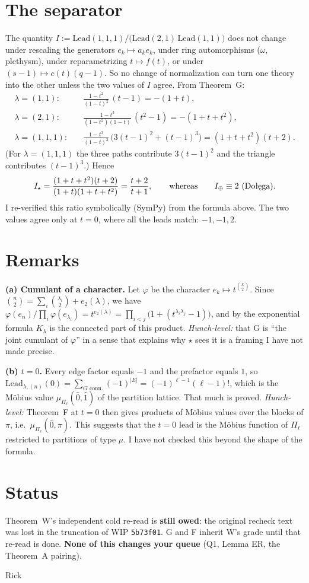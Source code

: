 \documentclass[10pt]{article}
\newcommand{\Lead}{\mathrm{Lead}}
\newcommand{\Dol}{Do\l{}\k{e}ga}
\begin{document}
\section{The separator}
The quantity $I:=\Lead(1,1,1)\big/\bigl(\Lead(2,1)\,\Lead(1,1)\bigr)$ does not change under rescaling the generators
$e_k\mapsto a_ke_k$, under ring automorphisms ($\omega$, plethysm), under reparametrizing $t\mapsto f(t)$, or under
$(s-1)\mapsto c(t)(q-1)$. So no change of normalization can turn one theory into the other unless the two values of $I$
agree. From Theorem~G:
\begin{align*}
\lambda=(1,1):&\quad \tfrac{1-t^2}{(1-t)^2}\,(t-1) = -(1+t),\\
\lambda=(2,1):&\quad \tfrac{1-t^3}{(1-t^2)(1-t)}\,(t^2-1) = -(1+t+t^2),\\
\lambda=(1,1,1):&\quad \tfrac{1-t^3}{(1-t)^3}\,\bigl(3(t-1)^2+(t-1)^3\bigr) = (1+t+t^2)(t+2).
\end{align*}
(For $\lambda=(1,1,1)$ the three paths contribute $3(t-1)^2$ and the triangle contributes $(t-1)^3$.) Hence
\[
  I_\star=\frac{(1+t+t^2)(t+2)}{(1+t)(1+t+t^2)}=\frac{t+2}{t+1},
  \qquad\text{whereas}\qquad I_\oplus\equiv 2\ \text{(\Dol)}.
\]
I re-verified this ratio symbolically (SymPy) from the formula above. The two values agree only at $t=0$, where all the
leads match: $-1,-1,2$.

\section{Remarks}
\textbf{(a) Cumulant of a character.} Let $\varphi$ be the character $e_k\mapsto t^{\binom k2}$. Since
$\binom n2=\sum_i\binom{\lambda_i}2+e_2(\lambda)$, we have
$\varphi(e_n)/\prod_i\varphi(e_{\lambda_i})=t^{e_2(\lambda)}=\prod_{i<j}\bigl(1+(t^{\lambda_i\lambda_j}-1)\bigr)$,
and by the exponential formula $K_\lambda$ is the connected part of this product. \emph{Hunch-level:} that G is
``the joint cumulant of $\varphi$'' in a sense that explains why $\star$ sees it is a framing I have not made precise.

\textbf{(b) $t=0$.} Every edge factor equals $-1$ and the prefactor equals $1$, so
$\Lead_{\lambda,(n)}(0)=\sum_{G\text{ conn.}}(-1)^{|E|}=(-1)^{\ell-1}(\ell-1)!$, which is the M\"obius value
$\mu_{\Pi_\ell}(\hat0,\hat1)$ of the partition lattice. That much is proved. \emph{Hunch-level:} Theorem~F at $t=0$
then gives products of M\"obius values over the blocks of $\pi$, i.e.\ $\mu_{\Pi_\ell}(\hat0,\pi)$. This suggests that
the $t=0$ lead is the M\"obius function of $\Pi_\ell$ restricted to partitions of type $\mu$. I have not checked this
beyond the shape of the formula.

\section{Status}
Theorem~W's independent cold re-read is \textbf{still owed}: the original recheck text was lost in the truncation of
WIP \texttt{5b73f01}. G and F inherit W's grade until that re-read is done. \textbf{None of this changes your queue}
(Q1, Lemma ER, the Theorem~A pairing).

\medskip\noindent Rick
\end{document}

